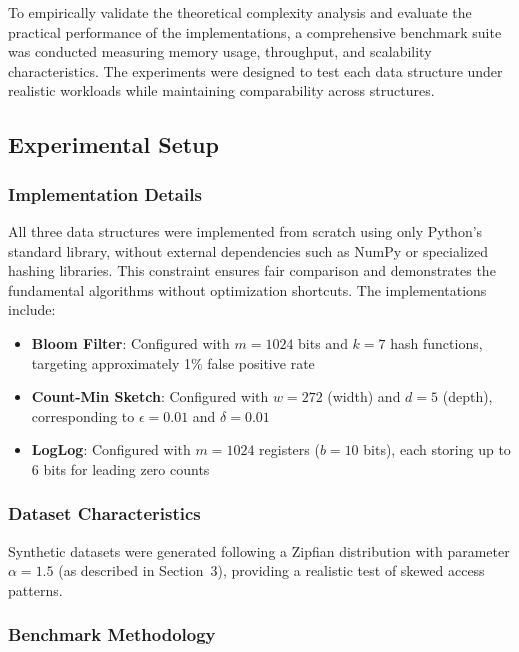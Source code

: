 To empirically validate the theoretical complexity analysis and evaluate the practical performance of the implementations, a comprehensive benchmark suite was conducted measuring memory usage, throughput, and scalability characteristics. The experiments were designed to test each data structure under realistic workloads while maintaining comparability across structures.

\subsection{Experimental Setup}

\subsubsection{Implementation Details}

All three data structures were implemented from scratch using only Python's standard library, without external dependencies such as NumPy or specialized hashing libraries. This constraint ensures fair comparison and demonstrates the fundamental algorithms without optimization shortcuts. The implementations include:

\begin{itemize}
    \item \textbf{Bloom Filter}: Configured with $m = 1024$ bits and $k = 7$ hash functions, targeting approximately 1\% false positive rate
    \item \textbf{Count-Min Sketch}: Configured with $w = 272$ (width) and $d = 5$ (depth), corresponding to $\epsilon = 0.01$ and $\delta = 0.01$
    \item \textbf{LogLog}: Configured with $m = 1024$ registers ($b = 10$ bits), each storing up to 6 bits for leading zero counts
\end{itemize}

\subsubsection{Dataset Characteristics}

Synthetic datasets were generated following a Zipfian distribution with parameter $\alpha = 1.5$ (as described in Section~3), providing a realistic test of skewed access patterns.

\subsubsection{Benchmark Methodology}

